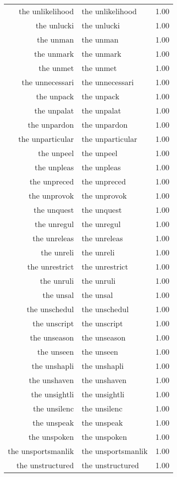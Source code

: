 \begin{table}[ht]
\begin{tabular}{rlr}
  the unlikelihood & the unlikelihood & 1.00 \\ 
  the unlucki & the unlucki & 1.00 \\ 
  the unman & the unman & 1.00 \\ 
  the unmark & the unmark & 1.00 \\ 
  the unmet & the unmet & 1.00 \\ 
  the unnecessari & the unnecessari & 1.00 \\ 
  the unpack & the unpack & 1.00 \\ 
  the unpalat & the unpalat & 1.00 \\ 
  the unpardon & the unpardon & 1.00 \\ 
  the unparticular & the unparticular & 1.00 \\ 
  the unpeel & the unpeel & 1.00 \\ 
  the unpleas & the unpleas & 1.00 \\ 
  the unpreced & the unpreced & 1.00 \\ 
  the unprovok & the unprovok & 1.00 \\ 
  the unquest & the unquest & 1.00 \\ 
  the unregul & the unregul & 1.00 \\ 
  the unreleas & the unreleas & 1.00 \\ 
  the unreli & the unreli & 1.00 \\ 
  the unrestrict & the unrestrict & 1.00 \\ 
  the unruli & the unruli & 1.00 \\ 
  the unsal & the unsal & 1.00 \\ 
  the unschedul & the unschedul & 1.00 \\ 
  the unscript & the unscript & 1.00 \\ 
  the unseason & the unseason & 1.00 \\ 
  the unseen & the unseen & 1.00 \\ 
  the unshapli & the unshapli & 1.00 \\ 
  the unshaven & the unshaven & 1.00 \\ 
  the unsightli & the unsightli & 1.00 \\ 
  the unsilenc & the unsilenc & 1.00 \\ 
  the unspeak & the unspeak & 1.00 \\ 
  the unspoken & the unspoken & 1.00 \\ 
  the unsportsmanlik & the unsportsmanlik & 1.00 \\ 
  the unstructured & the unstructured & 1.00 \\ 

\end{tabular}
\end{table}
